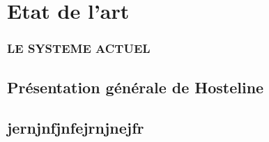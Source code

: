 \documentclass[MSc,extensionUQAC,english,french]{ulthese}
\begin{document}
\mainmatter


\part{Etat de l’art}

\section{LE SYSTEME ACTUEL}

\chapter{Présentation générale de Hosteline}

\chapter{jernjnfjnfejrnjnejfr}
\end{document}
